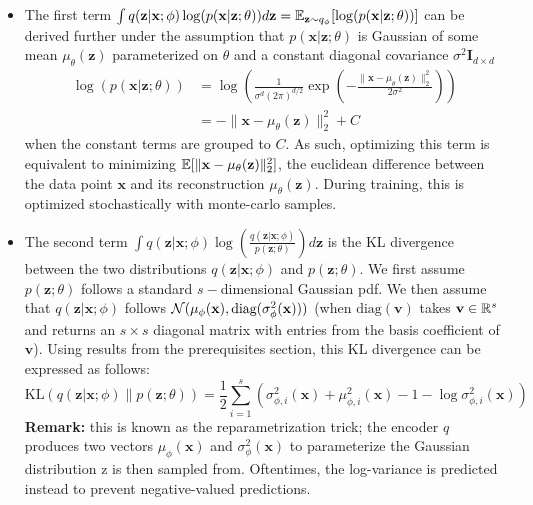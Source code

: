 \begin{itemize}
    \item The first term $\int q(\mathbf{z}|\mathbf{x};\phi) \log(p(\mathbf{x}|\mathbf{z};\theta)) d\mathbf{z}=\mathbb{E}_{\mathbf{z}\sim q_{\phi}}[\log(p(\mathbf{x}|\mathbf{z};\theta))]$ can be derived further under the assumption that $p(\mathbf{x}|\mathbf{z};\theta)$ is Gaussian of some mean $\mu_{\theta}(\mathbf{z})$ parameterized on $\theta$ and a constant diagonal covariance $\sigma^2 \mathbf{I}_{d\times d}$
    \begin{align*}
        \log(p(\mathbf{x}|\mathbf{z};\theta))
        &= \log\left( \frac{1}{\sigma^d (2\pi)^{d/2}} \exp\left( -\frac{\|\mathbf{x} - \mu_\theta(\mathbf{z})\|_2^2}{2\sigma^2} \right) \right) \\
        &= -\|\mathbf{x} - \mu_\theta(\mathbf{z})\|_2^2 + C
    \end{align*}
    when the constant terms are grouped to $C$. As such, optimizing this term is equivalent to minimizing $\mathbb{E}[\|\mathbf{x} - \mu_\theta(\mathbf{z})\|_2^2]$, the euclidean difference between the data point $\mathbf{x}$ and its reconstruction $\mu_\theta(\mathbf{z})$. During training, this is optimized stochastically with monte-carlo samples.
    \item The second term $\int q(\mathbf{z}|\mathbf{x};\phi) \log\left(\frac{q(\mathbf{z}|\mathbf{x};\phi)}{p(\mathbf{z};\theta)}\right) d\mathbf{z}$ is the KL divergence between the two distributions $q(\mathbf{z}|\mathbf{x};\phi)$ and $p(\mathbf{z};\theta)$. We first assume $p(\mathbf{z};\theta)$ follows a standard $s-$dimensional Gaussian pdf. We then assume that $q(\mathbf{z}|\mathbf{x};\phi)$ follows $\mathcal{N}(\mu_{\phi}(\mathbf{x}),\text{diag}(\sigma_{\phi}^2(\mathbf{x})))$ (when $\text{diag}(\mathbf{v})$ takes $\mathbf{v}\in\mathbb{R}^s$ and returns an $s\times s$ diagonal matrix with entries from the basis coefficient of $\mathbf{v}$). Using results from the prerequisites section, this KL divergence can be expressed as follows:
    \[
        \mathrm{KL}(q(\mathbf{z}|\mathbf{x};\phi) \| p(\mathbf{z};\theta)) = \frac{1}{2} \sum_{i=1}^s \left( \sigma_{\phi,i}^2(\mathbf{x}) + \mu_{\phi,i}^2(\mathbf{x}) - 1 - \log \sigma_{\phi,i}^2(\mathbf{x}) \right)
    \]
    \textbf{Remark:} this is known as the reparametrization trick; the encoder $q$ produces two vectors $\mu_{\phi}(\mathbf{x})$ and $\sigma_{\phi}^2(\mathbf{x})$ to parameterize the Gaussian distribution $\text{z}$ is then sampled from. Oftentimes, the log-variance is predicted instead to prevent negative-valued predictions.
\end{itemize}
